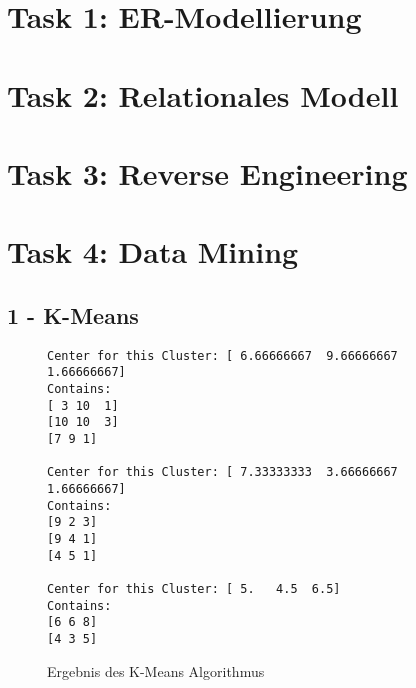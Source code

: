 
\newcommand{\dozent}{Prof. Dr. Agnès Voisard \\ Nicolas Lehmann}					%
\newcommand{\tutor}{Toni Draßdo}						%
\newcommand{\tutoriumNo}{04}				%
\newcommand{\ubungNo}{014}									%
\newcommand{\veranstaltung}{Datenbanksysteme}	%
\newcommand{\semester}{SoSe 18}						%
\newcommand{\studenten}{Eduard Beiline, Mark Niehues, Antoen Oehler}			%

\usepackage[normalem]{ulem}





\section*{Task 1: ER-Modellierung}


\section*{Task 2: Relationales Modell}


\section*{Task 3: Reverse Engineering}

\section*{Task 4: Data Mining}
\subsection*{1 - K-Means}
\begin{figure}[h!]
\begin{verbatim}
Center for this Cluster: [ 6.66666667  9.66666667  1.66666667]
Contains:
[ 3 10  1]
[10 10  3]
[7 9 1]

Center for this Cluster: [ 7.33333333  3.66666667  1.66666667]
Contains:
[9 2 3]
[9 4 1]
[4 5 1]

Center for this Cluster: [ 5.   4.5  6.5]
Contains:
[6 6 8]
[4 3 5]
\end{verbatim}
\caption{Ergebnis des K-Means Algorithmus}
\end{figure}

